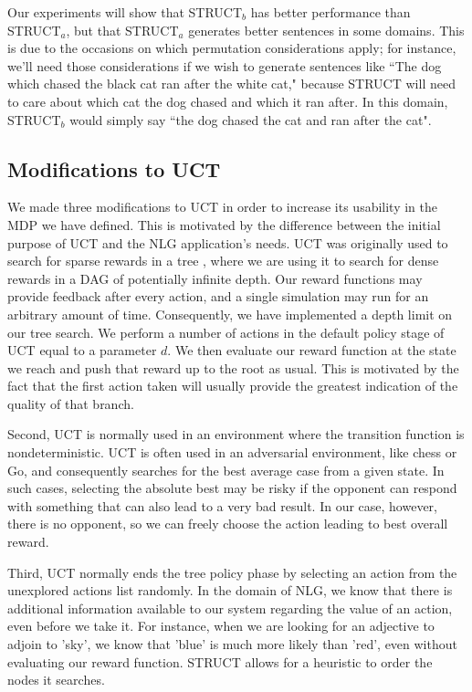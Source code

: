 Our experiments will show that STRUCT$_b$
has better performance than STRUCT$_a$, but that STRUCT$_a$ generates better
sentences in some domains.  This is due to the occasions on which
permutation considerations apply; for instance, we'll need those considerations
if we wish to generate sentences like ``The dog which chased the black cat ran
after the white cat," because STRUCT will need to care about which cat the dog
chased and which it ran after.  In this domain, STRUCT$_b$ would simply say
``the dog chased the cat and ran after the cat".

\subsection{Modifications to UCT}

We made three modifications to UCT in order to increase its usability
in the MDP we have defined.  This is motivated by the difference between
the initial purpose of UCT and the NLG application's needs.
UCT was originally used to search for sparse rewards
in a tree \cite{kocsis_bandit_2006}, where we are using it to search
for dense rewards in a DAG of potentially infinite depth.
Our reward functions may provide feedback after every action,
and a single simulation
may run for an arbitrary amount of time.
Consequently, we have implemented a depth limit
on our tree search.  We perform a number of actions in the
default policy stage of UCT equal to a parameter $d$.  We then
evaluate our reward function at the state we reach and push that
reward up to the root as usual.  This is motivated by the fact that the
first action taken will usually provide the greatest indication of the
quality of that branch.

Second, UCT is normally used in an environment where the transition
function is nondeterministic.  UCT is often used in an adversarial environment,
like chess or Go, and consequently searches for the best average case
from a given state.  In such cases,
selecting the absolute best may be risky if the opponent can respond
with something that can also lead to a very bad result. In our case,
however, there is no opponent, so we can freely choose the action
leading to best overall reward.

Third, UCT normally ends the tree policy phase by selecting an action
from the unexplored actions list randomly.  In the domain of NLG,
we know that there is additional information available to our system
regarding the value of an action, even before we take it. For instance,
when we are looking for an adjective to adjoin to 'sky', we know that 'blue' is
much more likely than 'red', even without evaluating our reward function.
STRUCT allows for a heuristic to order the nodes
it searches.

